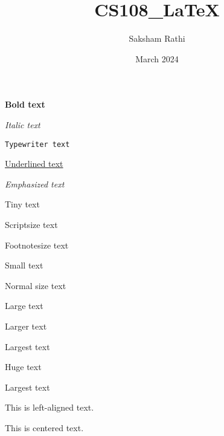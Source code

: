 \documentclass{article}
\title{CS108\_LaTeX}
\author{Saksham Rathi}
\date{March 2024}
\begin{document}
\maketitle

\textbf{Bold text}

\textit{Italic text}

\texttt{Typewriter text}

\underline{Underlined text}

\emph{Emphasized text}

{\tiny Tiny text}

{\scriptsize Scriptsize text}

{\footnotesize Footnotesize text}

{\small Small text}

{\normalsize Normal size text}

{\large Large text}

{\Large Larger text}

{\LARGE Largest text}

{\huge Huge text}

{\Huge Largest text}


\begin{flushleft}
    This is left-aligned text.
\end{flushleft}

\begin{center}
    This is centered text.
\end{center}
\end{document}
